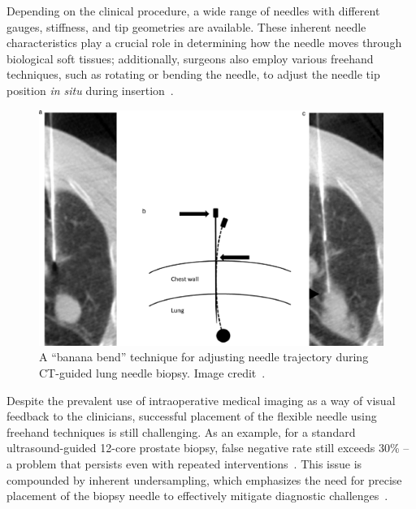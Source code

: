 Depending on the clinical procedure, a wide range of needles with different gauges, stiffness, and tip geometries are available. These inherent needle characteristics play a crucial role in determining how the needle moves through biological soft tissues; additionally, surgeons also employ various freehand techniques, such as rotating or bending the needle, to adjust the needle tip position \textit{in situ} during insertion~\parencite{calthorpeHistorySpinalNeedles2004,tsenNeedlesUsedSpinal2006,fritzAugmentedRealityVisualization2012,bourgouinImageGuidedPercutaneousLung2021,kimConsiderationsFluoroscopicGuided2020,shanahanComparisonPermanentProstate2002}. 

\begin{figure}[ht]
  \centering
  \includegraphics[width=0.68\columnwidth]{./figures/medical_images/banana-bend.jpg}
  \caption{A ``banana bend'' technique for adjusting needle trajectory during CT-guided lung needle biopsy. Image credit~\parencite{bourgouinImageGuidedPercutaneousLung2021}.}
  \label{fig:chap-1-banana-bend}
\end{figure}

Despite the prevalent use of intraoperative medical imaging as a way of visual feedback to the clinicians, successful placement of the flexible needle using freehand techniques is still challenging. As an example, for a standard ultrasound-guided 12-core prostate biopsy, false negative rate still exceeds 30\% -- a problem that persists even with repeated interventions~\parencite{serefogluHowReliable12Core2013}. This issue is compounded by inherent undersampling, which emphasizes the need for precise placement of the biopsy needle to effectively mitigate diagnostic challenges~\parencite{prestiProstateBiopsyCurrent2007}.

